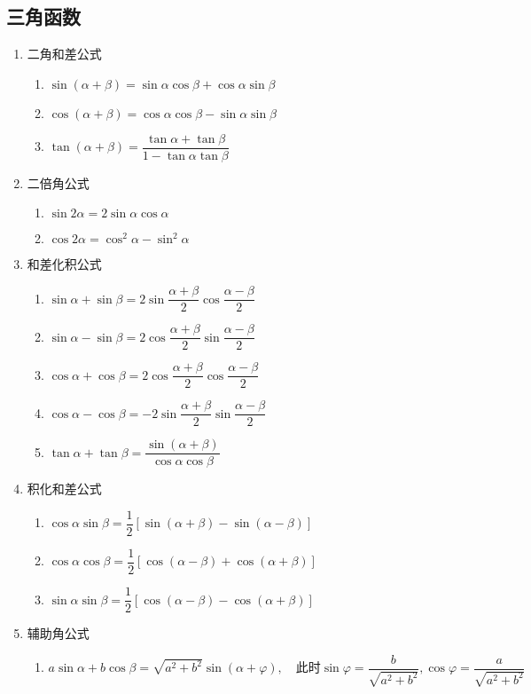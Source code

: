 \documentclass[12pt,a4paper,UTF8]{book}
\begin{document}
\subsection{三角函数}
\begin{enumerate}
\item 二角和差公式
\begin{enumerate}
\item $\sin\left(\alpha+\beta\right)=\sin\alpha\cos\beta+\cos\alpha\sin\beta$
\item $\cos\left(\alpha+\beta\right)=\cos\alpha\cos\beta-\sin\alpha\sin\beta$
\item $\tan\left(\alpha+\beta\right)=\dfrac{\tan\alpha+\tan\beta}{1-\tan\alpha\tan\beta}$
\end{enumerate}
\item 二倍角公式
\begin{enumerate}
\item $\sin2\alpha=2\sin\alpha\cos\alpha$
\item $\cos2\alpha=\cos^2\alpha-\sin^2\alpha$
\end{enumerate}
\item 和差化积公式
\begin{enumerate}
\item $\sin\alpha+\sin\beta=2\sin\dfrac{\alpha+\beta}{2}\cos\dfrac{\alpha-\beta}{2}$
\item $\sin\alpha-\sin\beta=2\cos\dfrac{\alpha+\beta}{2}\sin\dfrac{\alpha-\beta}{2}$
\item $\cos\alpha+\cos\beta=2\cos\dfrac{\alpha+\beta}{2}\cos\dfrac{\alpha-\beta}{2}$
\item $\cos\alpha-\cos\beta=-2\sin\dfrac{\alpha+\beta}{2}\sin\dfrac{\alpha-\beta}{2}$
\item $\tan\alpha+\tan\beta=\dfrac{\sin\left(\alpha+\beta\right)}{\cos\alpha\cos\beta}$
\end{enumerate}
\item 积化和差公式
\begin{enumerate}
\item $\cos\alpha\sin\beta=\dfrac{1}{2}\left[\sin\left(\alpha+\beta\right)-\sin\left(\alpha-\beta\right)\right]$
\item $\cos\alpha\cos\beta=\dfrac{1}{2}\left[\cos\left(\alpha-\beta\right)+\cos\left(\alpha+\beta\right)\right]$
\item $\sin\alpha\sin\beta=\dfrac{1}{2}\left[\cos\left(\alpha-\beta\right)-\cos\left(\alpha+\beta\right)\right]$
\end{enumerate}
\item 辅助角公式
\begin{enumerate}
\item $a\sin\alpha+b\cos\beta=\sqrt{a^2+b^2}\sin\left(\alpha+\varphi\right),\quad\text{此时}\sin\varphi=\dfrac{b}{\sqrt{a^2+b^2}},\cos\varphi=\dfrac{a}{\sqrt{a^2+b^2}}$
\end{enumerate}
\end{enumerate}
\end{document}
